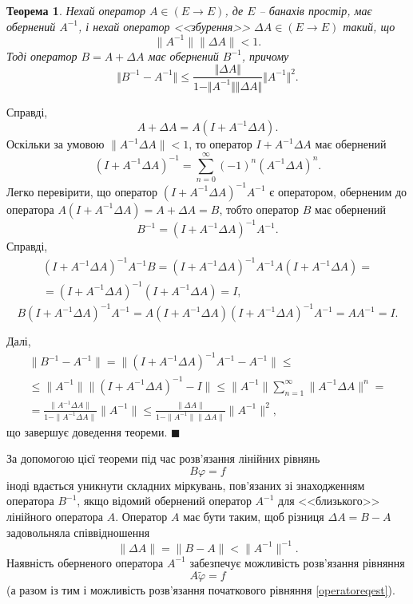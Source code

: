 \documentclass[14pt,twoside]{extreport}
\theoremstyle{mystyle}
\newtheorem{thm}{Теорема}
\renewenvironment{proof}{{\bfseries Доведення.}}{$\blacksquare$}
\numberwithin{equation}{chapter}
\begin{document}
\begin{thm}
	Нехай оператор $A \in (E \to E)$, де $E$ -- банахів простір, має обернений $A^{-1}$, і нехай оператор <<збурення>> $\Delta A \in (E \to E)$ такий, що
	\[
	\|A^{-1}\|\|\Delta A\| < 1.
	\]
	Тоді оператор $B = A + \Delta A$ має обернений $B^{-1}$, причому
	\[
	\Vert B^{-1} - A^{-1} \Vert \leqslant \frac{\Vert \Delta A\Vert}{1- \Vert A^{-1}\Vert \Vert \Delta A\Vert} \Vert A^{-1}\Vert^2.
	\]
\end{thm}
\begin{proof}
 Справді,
\[
 A+\Delta A = A(I+A^{-1}\Delta A).
\]
Оскільки за умовою $\|A^{-1} \Delta A\| < 1$, то оператор $I+A^{-1} \Delta A$ має обернений
\[
(I+A^{-1} \Delta A)^{-1} = \sum_{n=0}^{\infty} (-1)^n (A^{-1} \Delta A)^n.
\]
Легко перевірити, що оператор $(I+A^{-1}\Delta A)^{-1}A^{-1}$ є оператором, оберненим до оператора $A(I+A^{-1} \Delta A) = A+ \Delta A = B$, тобто оператор $B$ має обернений
\[
 B^{-1} = (I+A^{-1} \Delta A)^{-1} A^{-1}.
\]
Справді,
\begin{multline*}
 (I+A^{-1} \Delta A)^{-1} A^{-1} B = (I+A^{-1} \Delta A)^{-1} A^{-1} A (I+A^{-1} \Delta A) =\\
 = (I+A^{-1} \Delta A)^{-1} (I+A^{-1} \Delta A) = I,
\end{multline*}
\[
 B (I+A^{-1} \Delta A)^{-1} A^{-1} = A (I+A^{-1} \Delta A) (I+A^{-1} \Delta A)^{-1} A^{-1}  = A A^{-1} = I.
\]

Далі,
\begin{multline}\label{estapproxsol}
 \|B^{-1} - A^{-1}\| = \|(I + A^{-1} \Delta A)^{-1} A^{-1} - A^{-1}\| \leqslant\\
 \leqslant\|A^{-1} \| \|(I+A^{-1} \Delta A)^{-1} - I\| \leqslant \|A^{-1}\|\sum_{n=1}^{\infty} \|A^{-1} \Delta A\|^n=\\
= \frac{\|A^{-1} \Delta A\|}{1- \|A^{-1} \Delta A\|} \|A^{-1}\| \leqslant \frac{\|\Delta A\|}{1- \|A^{-1}\| \|\Delta A\|} \|A^{-1} \|^2,
\end{multline}
що завершує доведення теореми.
\end{proof}

За допомогою цієї теореми під час розв'язання лінійних рівнянь
\begin{equation}\label{operatoreqest}
 B\varphi = f
\end{equation}
іноді вдається уникнути складних міркувань, пов'язаних зі знаходженням оператора $B^{-1}$, якщо відомий обернений оператор $A^{-1}$ для <<близького>> лінійного оператора $A$. Оператор $A$ має бути таким, щоб різниця $\Delta A = B - A$ задовольняла співвідношення
\[
 \|\Delta A\| = \|B-A\|< \|A^{-1}\|^{-1}.
\]
Наявність оберненого оператора $A^{-1}$ забезпечує можливість розв'язання рівняння
\begin{equation}\label{approxfredeq}
 A\tilde{\varphi} = f
\end{equation}
(а разом із тим і можливість розв'язання початкового рівняння \eqref{operatoreqest}).
\end{document}
